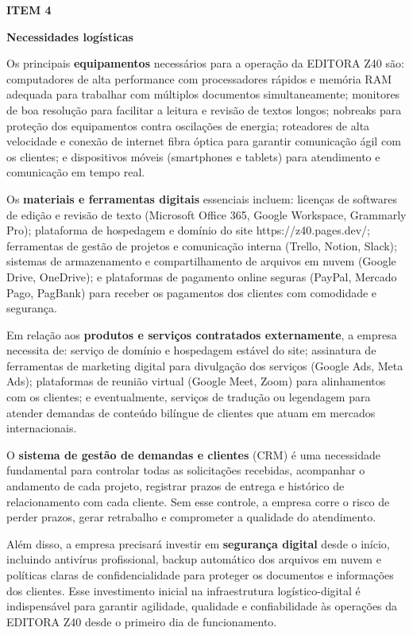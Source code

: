 \documentclass[10pt,a4paper]{article}
\newcommand{\zsiteplain}{https://\allowbreak{}z40.pages\allowbreak{}.dev/\allowbreak{}}
\newcommand{\labelfont}{\fontsize{5.8}{7.5}\selectfont\bfseries\addfontfeatures{LetterSpace=15}}
\newcommand{\headingfont}{\fontsize{9.8}{12}\selectfont\bfseries\color{navy}}
\newcommand{\separador}{\vspace{16pt}{\color{rulegray}\rule{\linewidth}{0.6pt}}\vspace{10pt}}
\newcommand{\itemh}[2]{\needspace{6\baselineskip}%
  {\labelfont\color{graylab}ITEM #1}\par\vspace{5pt}%
  {\headingfont #2}\par\vspace{8pt}}
\begin{document}
\separador
\itemh{4}{Necessidades logísticas}

Os principais \textbf{equipamentos} necessários para a operação da EDITORA Z40 são: computadores de alta performance com processadores rápidos e memória RAM adequada para trabalhar com múltiplos documentos simultaneamente; monitores de boa resolução para facilitar a leitura e revisão de textos longos; nobreaks para proteção dos equipamentos contra oscilações de energia; roteadores de alta velocidade e conexão de internet fibra óptica para garantir comunicação ágil com os clientes; e dispositivos móveis (smartphones e tablets) para atendimento e comunicação em tempo real.

Os \textbf{materiais e ferramentas digitais} essenciais incluem: licenças de softwares de edição e revisão de texto (Microsoft Office 365, Google Workspace, Grammarly Pro); plataforma de hospedagem e domínio do site \zsiteplain{}; ferramentas de gestão de projetos e comunicação interna (Trello, Notion, Slack); sistemas de armazenamento e compartilhamento de arquivos em nuvem (Google Drive, OneDrive); e plataformas de pagamento online seguras (PayPal, Mercado Pago, PagBank) para receber os pagamentos dos clientes com comodidade e segurança.

Em relação aos \textbf{produtos e serviços contratados externamente}, a empresa necessita de: serviço de domínio e hospedagem estável do site; assinatura de ferramentas de marketing digital para divulgação dos serviços (Google Ads, Meta Ads); plataformas de reunião virtual (Google Meet, Zoom) para alinhamentos com os clientes; e eventualmente, serviços de tradução ou legendagem para atender demandas de conteúdo bilíngue de clientes que atuam em mercados internacionais.

O \textbf{sistema de gestão de demandas e clientes} (CRM) é uma necessidade fundamental para controlar todas as solicitações recebidas, acompanhar o andamento de cada projeto, registrar prazos de entrega e histórico de relacionamento com cada cliente. Sem esse controle, a empresa corre o risco de perder prazos, gerar retrabalho e comprometer a qualidade do atendimento.

Além disso, a empresa precisará investir em \textbf{segurança digital} desde o início, incluindo antivírus profissional, backup automático dos arquivos em nuvem e políticas claras de confidencialidade para proteger os documentos e informações dos clientes. Esse investimento inicial na infraestrutura logístico-digital é indispensável para garantir agilidade, qualidade e confiabilidade às operações da EDITORA Z40 desde o primeiro dia de funcionamento.
\end{document}
